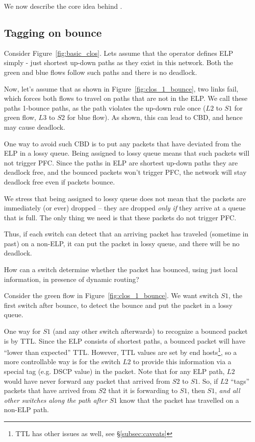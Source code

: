 We now describe the core idea behind \sysname{}.

\subsection{Tagging on bounce}
\label{subsec:tag}

Consider Figure~\ref{fig:basic_clos}. Lets assume that the operator defines ELP
simply - just shortest up-down paths as they exist in this network.  Both the
green and blue flows follow such paths and there is no deadlock.

Now, let's assume that as shown in Figure~\ref{fig:clos_1_bounce}, two links
fail, which forces both flows to travel on paths that are not in the ELP. We
call these paths 1-bounce paths, as the path violates the up-down rule once
($L2$ to $S1$ for green flow, $L3$ to $S2$ for blue flow). As shown, this can
lead to CBD, and hence may cause deadlock.

One way to avoid such CBD is to put any packets that have deviated from the ELP
 in a lossy queue.  Being assigned to lossy queue means that such packets
will not trigger PFC. Since the paths in ELP are shortest up-down paths they are
deadlock free, and the bounced packets won't trigger PFC, the network will stay
deadlock free even if packets bounce.

We stress that being assigned to lossy queue does not mean that the packets are
immediately (or ever) dropped -- they are dropped {\em only if} they arrive at a
queue that is full. The only thing we need is that these packets do not trigger
PFC.

Thus, if each switch can detect that an arriving packet has traveled (sometime
in past) on a non-ELP, it can put the packet in lossy queue, and there will be
no deadlock.

How can a switch determine whether the packet has bounced, using just local
information, in presence of dynamic routing?

Consider the green flow in Figure~\ref{fig:clos_1_bounce}.  We want switch $S1$,
the first switch after bounce, to detect the bounce and put the packet in a
lossy queue.

One way for $S1$ (and any other switch afterwards) to recognize a bounced packet
is by TTL. Since the ELP consists of shortest paths, a bounced packet will have
``lower than expected'' TTL. However, TTL values are set by end
hosts\footnote{TTL has other issues as well, see \S\ref{subsec:caveats}}, so a
more controllable way is for the switch $L2$ to provide this information via a
special tag (e.g. DSCP value) in the packet. Note that for any ELP path, $L2$
would have never forward any packet that arrived from $S2$ to $S1$. So, if $L2$
``tags'' packets that have arrived from $S2$ that it is forwarding to $S1$, then
$S1$, {\em and all other switches along the path after $S1$} know that the
packet has travelled on a non-ELP path.

